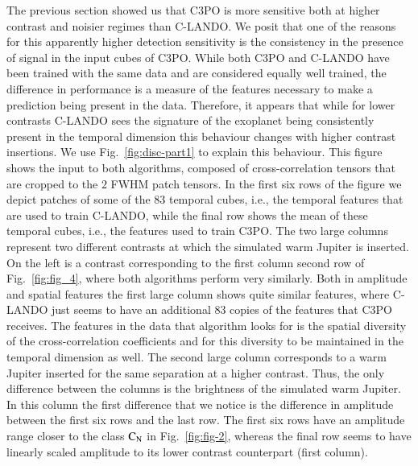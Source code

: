 \documentclass{aa}
\begin{document}
The previous section showed us that C3PO is more sensitive both at higher contrast and noisier regimes than C-LANDO.
We posit that one of the reasons for this apparently higher detection sensitivity is the consistency in the presence of signal in the input cubes of C3PO.
While both C3PO and C-LANDO have been trained with the same data and are considered equally well trained, the difference in performance is a measure of the features necessary to make a prediction being present in the data.
Therefore, it appears that while for lower contrasts C-LANDO sees the signature of the exoplanet being consistently present in the temporal dimension this behaviour changes with higher contrast insertions.
We use Fig.~\ref{fig:disc-part1} to explain this behaviour.
This figure shows the input to both algorithms, composed of cross-correlation tensors that are cropped to the $2$ FWHM patch tensors.
In the first six rows of the figure we depict patches of some of the $83$ temporal cubes, i.e., the temporal features that are used to train C-LANDO, while the final row shows the mean of these temporal cubes, i.e., the features used to train C3PO.
The two large columns represent two different contrasts at which the simulated warm Jupiter is inserted. On the left is a contrast corresponding to the first column second row of Fig.~\ref{fig:fig_4}, where both algorithms perform very similarly.
Both in amplitude and spatial features the first large column shows quite similar features, where C-LANDO just seems to have an additional $83$ copies of the features that C3PO receives. 
The features in the data that algorithm looks for is the spatial diversity of the cross-correlation coefficients and for this diversity to be maintained in the temporal dimension as well.
The second large column corresponds to a warm Jupiter inserted for the same separation at a higher contrast.
Thus, the only difference between the columns is the brightness of the simulated warm Jupiter.
In this column the first difference that we notice is the difference in amplitude between the first six rows and the last row.
The first six rows have an amplitude range closer to the class $\rm{C_N}$ in Fig.~\ref{fig:fig-2}, whereas the final row seems to have linearly scaled amplitude to its lower contrast counterpart (first column).
\end{document}
